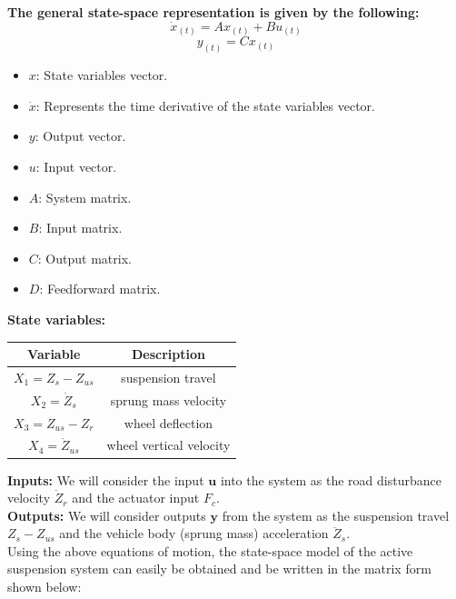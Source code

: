 \textbf{The general state-space representation is given by the following:}
$$\dot{x}_{(t)}=Ax_{(t)}+Bu_{(t)}$$
$$y_{(t)}=Cx_{(t)}$$

\begin{itemize}
	\item $x$: State variables vector.
	\item $\dot{x}$: Represents the time derivative of the state variables vector.
	\item $y$: Output vector.
	\item $u$: Input vector.
	\item $A$: System matrix.
	\item $B$: Input matrix.
	\item $C$: Output matrix.
	\item $D$: Feedforward matrix.\\
\end{itemize}

\textbf{State variables:}
\begin{center}
	\begin{tabular}{|c|c|}
		\hline
		\textbf{Variable} & \textbf{Description} \\ \hline
		$X_1 = Z_s - Z_{us}$ & suspension travel \\ \hline
		$X_2 = \dot{Z}_s$ & sprung mass velocity \\ \hline
		$X_3 = Z_{us} - Z_r$ & wheel deflection \\ \hline
		$X_4 = \dot{Z}_{us}$ & wheel vertical velocity \\ \hline
	\end{tabular}
\end{center}

\newpage
\textbf{Inputs:} We will consider the input $\boldsymbol{u}$ into the system as the road disturbance velocity $\dot{Z}_r$ and the actuator input $F_c$.\\

\textbf{Outputs:} We will consider outputs $\boldsymbol{y}$ from the system as the suspension travel $Z_s-Z_{us}$ and the vehicle body (sprung mass) acceleration $\ddot{Z}_s$.\\

Using the above equations of motion, the state-space model of the active suspension system can easily be obtained and be written in the matrix form shown below:

